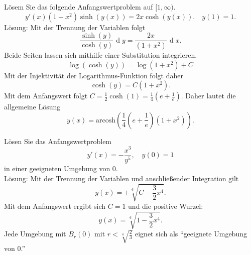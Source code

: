 \documentclass[parskip=full]{scrartcl}
\DeclareMathOperator{\diff}{\mathop{}\!\mathrm{d}}
\begin{document}
Lösem Sie das folgende Anfangswertproblem auf $[1, \infty)$.
\begin{displaymath}
  y'(x)(1 + x^2) \sinh(y(x)) = 2x \cosh(y(x)). \quad y(1) = 1.
\end{displaymath}
Lösung: Mit der Trennung der Variablen folgt
\begin{displaymath}
  \frac{\sinh(y)}{\cosh(y)} \diff y = \frac{2x}{(1 + x^2)} \diff x.
\end{displaymath}
Beide Seiten lassen sich mithilfe einer Substitution integrieren.
\begin{displaymath}
  \log(\cosh(y)) = \log(1 + x^2) + C
\end{displaymath}
Mit der Injektivität der Logarithmus-Funktion folgt daher
\begin{displaymath}
  \cosh(y) = C(1 + x^2).
\end{displaymath}
Mit dem Anfangswert folgt $C = \frac{1}{2} \cosh(1) = \frac{1}{4}\left(e + \frac{1}{e}\right)$.
Daher lautet die allgemeine Lösung
\begin{displaymath}
  y(x) = \text{arcosh}\left(\frac{1}{4}(e + \frac{1}{e})(1 + x^2)\right).
\end{displaymath}

Lösen Sie das Anfangswertproblem 
\begin{displaymath}
  y'(x) = -\frac{x^3}{y^5}, \quad y(0) = 1
\end{displaymath}
in einer geeigneten Umgebung von 0.\\
Lösung: 
Mit der Trennung der Variablen und anschließender Integration gilt
\begin{displaymath}
  y(x) = \pm \sqrt[6]{C - \frac{3}{2}x^4}.
\end{displaymath}
Mit dem Anfangswert ergibt sich $C = 1$ und die positive Wurzel:
\begin{displaymath}
  y(x) = \sqrt[6]{1 - \frac{3}{2}x^4}.
\end{displaymath}
Jede Umgebung mit $B_r(0)$ mit $r < \sqrt[4]{\frac{2}{3}}$ eignet sich als ``geeignete Umgebung von 0.''
\end{document}
